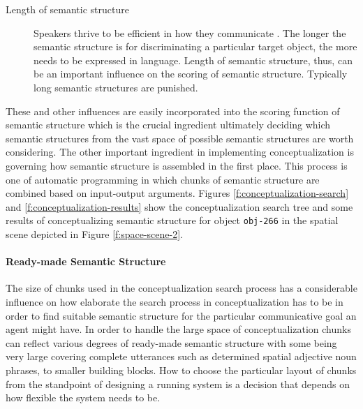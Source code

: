 \begin{description}
\item[Length of semantic structure]
Speakers thrive to be efficient in how
they communicate \citep{dale1995computational}. The longer the 
semantic structure is for
discriminating a particular target object, the more needs to
be expressed in language. Length of semantic structure, thus, 
can be an important influence on the scoring of semantic structure.
Typically long semantic structures are punished.
\end{description}



These and other influences are easily incorporated 
into the scoring function of semantic structure which is the crucial
ingredient ultimately deciding which semantic structures from the vast space
of possible semantic structures are worth considering. 
The other important ingredient in implementing conceptualization 
is governing how semantic structure is assembled in the first place.
This process is one of automatic programming in which
chunks of semantic structure are combined based on 
input-output arguments. Figures \ref{f:conceptualization-search} 
and \ref{f:conceptualization-results} show the conceptualization 
search tree and some results of conceptualizing semantic 
structure for object {\footnotesize\tt obj-266} 
in the spatial scene depicted in Figure \ref{f:space-scene-2}.


\paragraph*{Ready-made Semantic Structure}
The size of chunks used in the conceptualization search process 
has a considerable influence on how elaborate
the search process in conceptualization has to be in order to find suitable
semantic structure for the particular communicative goal an agent might have.
In order to handle the large space of conceptualization chunks can 
reflect various degrees of ready-made semantic structure with some 
being very large covering complete utterances such as determined spatial
adjective noun phrases, to smaller building blocks. How to choose 
the particular layout of chunks from the standpoint of designing
a running system is a decision that depends on how flexible the system
needs to be.


